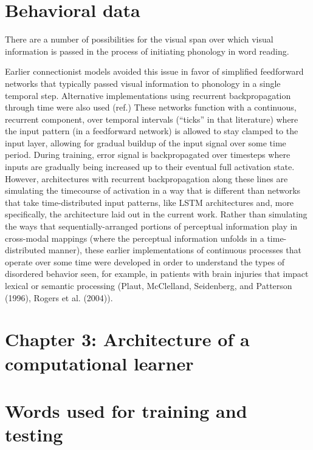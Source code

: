 \documentclass[
  american,
  man,floatsintext]{apa6}
\begin{document}
\hypertarget{behavioral-data}{%
\section{Behavioral data}\label{behavioral-data}}

There are a number of possibilities for the visual span over which visual information is passed in the process of initiating phonology in word reading.

Earlier connectionist models avoided this issue in favor of simplified feedforward networks that typically passed visual information to phonology in a single temporal step. Alternative implementations using recurrent backpropagation through time were also used (ref.) These networks function with a continuous, recurrent component, over temporal intervals (``ticks'' in that literature) where the input pattern (in a feedforward network) is allowed to stay clamped to the input layer, allowing for gradual buildup of the input signal over some time period. During training, error signal is backpropagated over timesteps where inputs are gradually being increased up to their eventual full activation state. However, architectures with recurrent backpropagation along these lines are simulating the timecourse of activation in a way that is different than networks that take time-distributed input patterns, like LSTM architectures and, more specifically, the architecture laid out in the current work. Rather than simulating the ways that sequentially-arranged portions of perceptual information play in cross-modal mappings (where the perceptual information unfolds in a time-distributed manner), these earlier implementations of continuous processes that operate over some time were developed in order to understand the types of disordered behavior seen, for example, in patients with brain injuries that impact lexical or semantic processing (Plaut, McClelland, Seidenberg, and Patterson (1996), Rogers et al. (2004)).

\hypertarget{chapter-3-architecture-of-a-computational-learner}{%
\section{Chapter 3: Architecture of a computational learner}\label{chapter-3-architecture-of-a-computational-learner}}

\hypertarget{words-used-for-training-and-testing}{%
\section{Words used for training and testing}\label{words-used-for-training-and-testing}}
\end{document}
